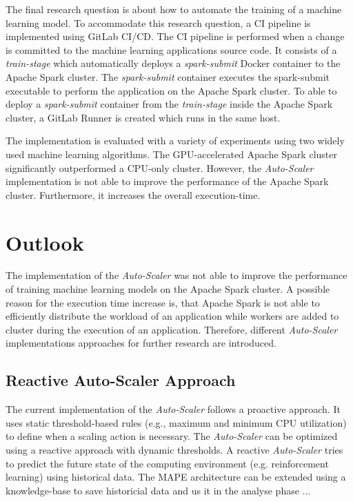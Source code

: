 The final research question is about how to automate the training of a machine learning model.
%
To accommodate this research question, a CI pipeline is implemented using GitLab CI/CD. The CI pipeline is performed when a change is committed to the machine learning applications source code.
It consists of a \textit{train-stage} which automatically deploys a \textit{spark-submit} Docker container to the Apache Spark cluster.
The \textit{spark-submit} container executes the spark-submit executable to perform the application on the Apache Spark cluster.
To able to deploy a \textit{spark-submit} container from the \textit{train-stage} inside the Apache Spark cluster, a GitLab Runner is created which runs in the same host.


The implementation is evaluated with a variety of experiments using two widely used machine learning algorithms.
The GPU-accelerated Apache Spark cluster significantly outperformed a CPU-only cluster.
However, the \textit{Auto-Scaler} implementation is not able to improve the performance of the Apache Spark cluster. Furthermore, it increases the overall execution-time.


\section{Outlook}
The implementation of the \textit{Auto-Scaler} was not able to improve the performance of training machine learning models on the Apache Spark cluster.
A possible reason for the execution time increase is, that Apache Spark is not able to efficiently distribute the workload of an application while workers are added to cluster during the execution of an application.
Therefore, different \textit{Auto-Scaler} implementations approaches for further research are introduced.


\subsection{Reactive Auto-Scaler Approach}
The current implementation of the \textit{Auto-Scaler} follows a proactive approach. It uses static threshold-based rules (e.g., maximum and minimum CPU utilization) to define when a scaling action is necessary.
The \textit{Auto-Scaler} can be optimized using a reactive approach with dynamic thresholds. A reactive \textit{Auto-Scaler} tries to predict the future state of the computing environment (e.g. reinforcement learning) using historical data.
The MAPE architecture can be extended using a knowledge-base to save historicial data and us it in the analyse phase ...


